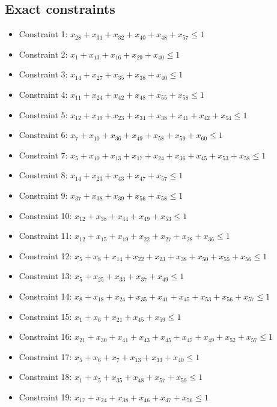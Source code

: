 \documentclass[11pt]{article}
\begin{document}
\subsection*{Exact constraints}
\begin{itemize}
\item Constraint 1: $x_{28} + x_{31} + x_{32} + x_{40} + x_{48} + x_{57} \le 1$
\item Constraint 2: $x_{1} + x_{13} + x_{16} + x_{29} + x_{40} \le 1$
\item Constraint 3: $x_{14} + x_{27} + x_{35} + x_{38} + x_{40} \le 1$
\item Constraint 4: $x_{11} + x_{24} + x_{42} + x_{48} + x_{55} + x_{58} \le 1$
\item Constraint 5: $x_{12} + x_{19} + x_{23} + x_{34} + x_{38} + x_{41} + x_{42} + x_{54} \le 1$
\item Constraint 6: $x_{7} + x_{10} + x_{36} + x_{49} + x_{58} + x_{59} + x_{60} \le 1$
\item Constraint 7: $x_{5} + x_{10} + x_{13} + x_{17} + x_{24} + x_{36} + x_{45} + x_{53} + x_{58} \le 1$
\item Constraint 8: $x_{14} + x_{23} + x_{43} + x_{47} + x_{57} \le 1$
\item Constraint 9: $x_{37} + x_{38} + x_{39} + x_{56} + x_{58} \le 1$
\item Constraint 10: $x_{12} + x_{38} + x_{44} + x_{49} + x_{53} \le 1$
\item Constraint 11: $x_{12} + x_{15} + x_{19} + x_{22} + x_{27} + x_{28} + x_{36} \le 1$
\item Constraint 12: $x_{5} + x_{8} + x_{14} + x_{22} + x_{23} + x_{38} + x_{50} + x_{55} + x_{56} \le 1$
\item Constraint 13: $x_{5} + x_{25} + x_{33} + x_{37} + x_{49} \le 1$
\item Constraint 14: $x_{8} + x_{18} + x_{24} + x_{35} + x_{41} + x_{45} + x_{53} + x_{56} + x_{57} \le 1$
\item Constraint 15: $x_{1} + x_{6} + x_{21} + x_{45} + x_{59} \le 1$
\item Constraint 16: $x_{21} + x_{30} + x_{41} + x_{43} + x_{45} + x_{47} + x_{49} + x_{52} + x_{57} \le 1$
\item Constraint 17: $x_{5} + x_{6} + x_{7} + x_{13} + x_{33} + x_{40} \le 1$
\item Constraint 18: $x_{1} + x_{5} + x_{35} + x_{48} + x_{57} + x_{59} \le 1$
\item Constraint 19: $x_{17} + x_{24} + x_{38} + x_{46} + x_{47} + x_{56} \le 1$

\end{itemize}
\end{document}
